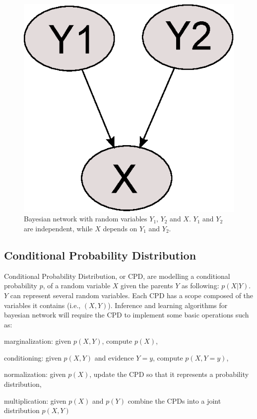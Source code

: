 \documentclass[11pt]{article}
\begin{document}
\begin{figure}[h]
\centering
\includegraphics{img/bn1.eps}
\caption{Bayesian network with random variables $Y_1$, $Y_2$ and $X$. $Y_1$ and $Y_2$ are independent, while $X$ depends on $Y_1$ and $Y_2$.}
\label{bn1}
\end{figure}



\subsection{Conditional Probability Distribution}
Conditional Probability Distribution, or CPD, are modelling a conditional probability $p$, of a random variable $X$ given the parents $Y$ as following: $p(X|Y)$. $Y$ can represent several random variables. Each CPD has a scope composed of the variables it contains (i.e., $(X,Y)$). Inference and learning algorithms for bayesian network will require the CPD to implement some basic operations such as:
\begin{compactitem}
\item marginalization: given $p(X,Y)$, compute $p(X)$,
\item conditioning: given $p(X,Y)$ and evidence $Y=y$, compute $p(X,Y=y)$,
\item normalization: given $p(X)$, update the CPD so that it represents a probability distribution,
\item multiplication: given $p(X)$ and $p(Y)$ combine the CPDs into a joint distribution $p(X,Y)$
\end{compactitem}
\end{document}

